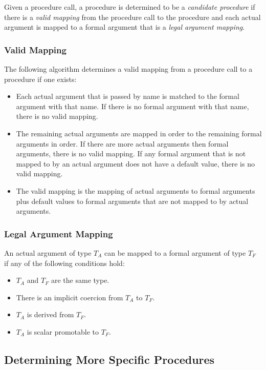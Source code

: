 Given a procedure call, a procedure is determined to be
a \emph{candidate procedure} if there is a \emph{valid mapping} from
the procedure call to the procedure and each actual argument is mapped
to a formal argument that is a \emph{legal argument mapping}.

\subsubsection{Valid Mapping}
\label{Valid_Mapping}

The following algorithm determines a valid mapping from a procedure
call to a procedure if one exists:
\begin{itemize}
\item
Each actual argument that is passed by name is matched to the formal
argument with that name.  If there is no formal argument with that
name, there is no valid mapping.
\item
The remaining actual arguments are mapped in order to the remaining
formal arguments in order.  If there are more actual arguments then
formal arguments, there is no valid mapping.  If any formal argument
that is not mapped to by an actual argument does not have a default
value, there is no valid mapping.
\item
The valid mapping is the mapping of actual arguments to formal
arguments plus default values to formal arguments that are not mapped
to by actual arguments.
\end{itemize}

\subsubsection{Legal Argument Mapping}

An actual argument of type $T_A$ can be mapped to a formal argument of
type $T_F$ if any of the following conditions hold:
\begin{itemize}
\item $T_A$ and $T_F$ are the same type.
\item There is an implicit coercion from $T_A$ to $T_F$.
\item $T_A$ is derived from $T_F$.
\item $T_A$ is scalar promotable to $T_F$.
\end{itemize}

\subsection{Determining More Specific Procedures}
\label{Determining_More_Specific_Procedures}

